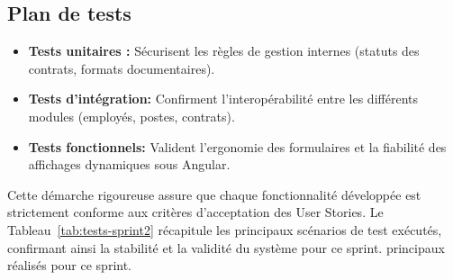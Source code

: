 \subsection{Plan de tests}

\begin{itemize}[label=\textbullet, leftmargin=0.6cm]
    \item \textbf{Tests unitaires :} Sécurisent les règles de gestion internes (statuts des contrats, formats documentaires).
    \item \textbf{Tests d'intégration:} Confirment l'interopérabilité entre les différents modules (employés, postes, contrats).
    \item \textbf{Tests fonctionnels:} Valident l'ergonomie des formulaires et la fiabilité des affichages dynamiques sous Angular.
\end{itemize}
Cette démarche rigoureuse assure que chaque fonctionnalité développée est strictement conforme aux critères d'acceptation des User Stories. Le Tableau~\ref{tab:tests-sprint2} récapitule les principaux scénarios de test exécutés, confirmant ainsi la stabilité et la validité du système pour ce sprint.
principaux réalisés pour ce sprint.
\renewcommand{\arraystretch}{1.3}
